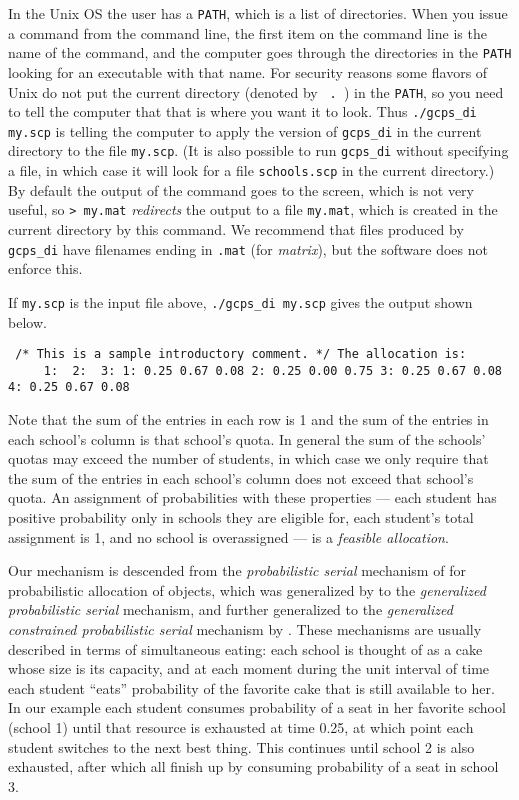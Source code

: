 \documentclass[12pt]{article}
\theoremstyle{definition}
\begin{document}
In the Unix OS the user has a \texttt{PATH}, which is a list of
directories.  When you issue a command from the command line, the
first item on the command line is the name of the command, and the
computer goes through the directories in the \texttt{PATH} looking for
an executable with that name.  For security reasons some flavors of
Unix do not put the current directory (denoted by \texttt{\ .\ }) in
the \texttt{PATH}, so you need to tell the computer that that is where
you want it to look.  Thus \texttt{./gcps\_di my.scp} is telling the
computer to apply the version of \texttt{gcps\_di} in the current
directory to the file \texttt{my.scp}.  (It is also possible to run
\texttt{gcps\_di} without specifying a file, in which case it will
look for a file \texttt{schools.scp} in the current directory.)  By
default the output of the command goes to the screen, which is not
very useful, so \texttt{> my.mat} \emph{redirects} the output to a
file \texttt{my.mat}, which is created in the current directory by
this command.  We recommend that files produced by \texttt{gcps\_di}
have filenames ending in \texttt{.mat} (for \emph{matrix}), but the
software does not enforce this.

If \texttt{my.scp} is the input file above, \texttt{./gcps\_di my.scp}
gives the output shown below.
\medskip
\begin{obeylines}\texttt{
/* This is a sample introductory comment. */
The allocation is:
\ \ \ \ \ 1:    \    2:  \      3:
1:      0.25     0.67     0.08
2:      0.25     0.00     0.75
3:      0.25     0.67     0.08
4:      0.25     0.67     0.08
}
\end{obeylines} \noindent

\smallskip \noindent
Note that the sum of the entries in each row is 1 and the sum of the
entries in each school's column is that school's quota.  In general
the sum of the schools' quotas may exceed the number of students, in
which case we only require that the sum of the entries in each
school's column does not exceed that school's quota. An assignment of
probabilities with these properties --- each student has positive
probability only in schools they are eligible for, each student's
total assignment is 1, and no school is overassigned --- is a
\emph{feasible allocation}.

Our mechanism is descended from the \emph{probabilistic serial}
mechanism of \cite{bm01} for probabilistic allocation of objects,
which was generalized by \cite{bckm13aer} to the \emph{generalized
probabilistic serial} mechanism, and further generalized to the
\emph{generalized constrained probabilistic serial} mechanism by
\cite{balbuzanov22jet}.  These mechanisms are usually described in
terms of simultaneous eating: each school is thought of as a cake
whose size is its capacity, and at each moment during the unit
interval of time each student ``eats'' probability of the favorite
cake that is still available to her.  In our example each student
consumes probability of a seat in her favorite school (school 1) until
that resource is exhausted at time 0.25, at which point each student
switches to the next best thing.  This continues until school 2 is
also exhausted, after which all finish up by consuming probability of
a seat in school 3.
\end{document}
